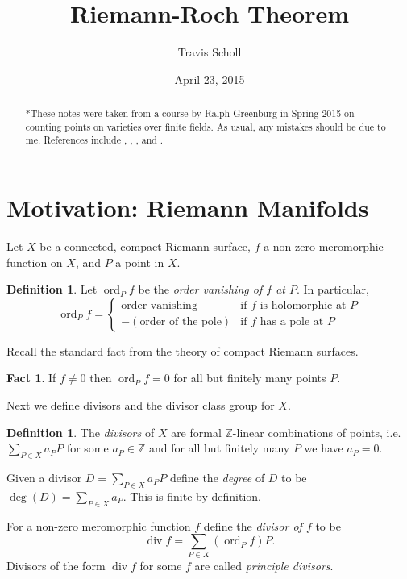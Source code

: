 \documentclass[11pt]{article}
\date{April 23, 2015}
\newcommand{\BB}[1]{\mathbb{#1}} %
\newcommand{\ZZ}{\BB{Z}}
\renewcommand{\div}{\operatorname{div}} %
\newcommand{\ord}{\operatorname{ord}}
\theoremstyle{plain}
\theoremstyle{definition}
\newtheorem{defn}[definitionCounter]{Definition}
\newtheorem{fact}[factCounter]{Fact}
\theoremstyle{remark}
\newcommand{\mytitle}{Riemann-Roch Theorem}
\newcommand{\myauthor}{Travis Scholl}
\begin{document}
\title{\sffamily \mytitle}
\author{\sc \myauthor }
\maketitle

\begin{abstract}
	*These notes were taken from a course by Ralph Greenburg in Spring 2015 on counting points on varieties over finite fields. As usual, any mistakes should be due to me. References include \cite{soren1996}, \cite{ireland2013classical}, \cite{ralphscourse}, and \cite{serre2012course}.
\end{abstract}

\section{Motivation: Riemann Manifolds}
\hfill

Let $X$ be a connected, compact Riemann surface, $f$ a non-zero meromorphic function on $X$, and $P$ a point in $X$.

\begin{defn}
	Let $\ord_P f$ be the \emph{order vanishing of $f$ at $P$}. In particular,
	$$
	\ord_P f =
	\begin{cases}
		\text{order vanishing} &\text{if $f$ is holomorphic at $P$}
		\\
		-(\text{order of the pole}) &\text{if $f$ has a pole at $P$}
	\end{cases}
	$$
\end{defn}

Recall the standard fact from the theory of compact Riemann surfaces.

\begin{fact}\label{divffinitedegree}
	If $f\neq 0$ then $\ord_P f = 0$ for all but finitely many points $P$.
\end{fact}

Next we define divisors and the divisor class group for $X$.

\begin{defn}\label{divisors}
	The \emph{divisors} of $X$ are formal $\ZZ$-linear combinations of points, i.e. $\sum_{P\in X}a_P P$ for some $a_P\in\ZZ$ and for all but finitely many $P$ we have $a_P=0$.

	Given a divisor $D = \sum_{P\in X}a_P P$ define the \emph{degree} of $D$ to be $\deg(D) = \sum_{P\in X} a_P$. This is finite by definition.

	For a non-zero meromorphic function $f$ define the \emph{divisor of $f$} to be
	$$
	\div f = \sum_{P\in X} (\ord_P f)P.
	$$
	Divisors of the form $\div f$ for some $f$ are called \emph{principle divisors}.
\end{defn}
\end{document}
